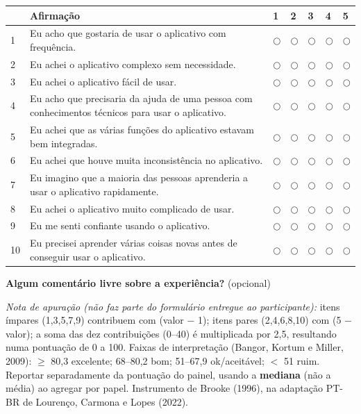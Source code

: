 \documentclass[11pt,a4paper]{article}
\begin{document}
\vspace{4mm}
\renewcommand{\arraystretch}{1.6}
\noindent\begin{tabular}{@{}p{0.6cm}p{8.2cm}p{1.0cm}p{1.0cm}p{1.0cm}p{1.0cm}p{1.0cm}@{}}
  \toprule
   & \textbf{Afirmação} & \textbf{1} & \textbf{2} & \textbf{3} & \textbf{4} & \textbf{5} \\
  \midrule
  1 & Eu acho que gostaria de usar o aplicativo com frequência. & $\bigcirc$ & $\bigcirc$ & $\bigcirc$ & $\bigcirc$ & $\bigcirc$ \\
  2 & Eu achei o aplicativo complexo sem necessidade. & $\bigcirc$ & $\bigcirc$ & $\bigcirc$ & $\bigcirc$ & $\bigcirc$ \\
  3 & Eu achei o aplicativo fácil de usar. & $\bigcirc$ & $\bigcirc$ & $\bigcirc$ & $\bigcirc$ & $\bigcirc$ \\
  4 & Eu acho que precisaria da ajuda de uma pessoa com conhecimentos técnicos para usar o aplicativo. & $\bigcirc$ & $\bigcirc$ & $\bigcirc$ & $\bigcirc$ & $\bigcirc$ \\
  5 & Eu achei que as várias funções do aplicativo estavam bem integradas. & $\bigcirc$ & $\bigcirc$ & $\bigcirc$ & $\bigcirc$ & $\bigcirc$ \\
  6 & Eu achei que houve muita inconsistência no aplicativo. & $\bigcirc$ & $\bigcirc$ & $\bigcirc$ & $\bigcirc$ & $\bigcirc$ \\
  7 & Eu imagino que a maioria das pessoas aprenderia a usar o aplicativo rapidamente. & $\bigcirc$ & $\bigcirc$ & $\bigcirc$ & $\bigcirc$ & $\bigcirc$ \\
  8 & Eu achei o aplicativo muito complicado de usar. & $\bigcirc$ & $\bigcirc$ & $\bigcirc$ & $\bigcirc$ & $\bigcirc$ \\
  9 & Eu me senti confiante usando o aplicativo. & $\bigcirc$ & $\bigcirc$ & $\bigcirc$ & $\bigcirc$ & $\bigcirc$ \\
  10 & Eu precisei aprender várias coisas novas antes de conseguir usar o aplicativo. & $\bigcirc$ & $\bigcirc$ & $\bigcirc$ & $\bigcirc$ & $\bigcirc$ \\
  \bottomrule
\end{tabular}

\vspace{5mm}
\noindent\textbf{Algum comentário livre sobre a experiência?} (opcional)

\vspace{2mm}
\noindent\hrulefill

\vspace{2mm}
\noindent\hrulefill

\vfill
\noindent\footnotesize\textit{Nota de apuração (não faz parte do formulário entregue ao
participante):} itens ímpares (1,3,5,7,9) contribuem com (valor $-$ 1); itens pares (2,4,6,8,10)
com (5 $-$ valor); a soma das dez contribuições (0--40) é multiplicada por 2,5, resultando numa
pontuação de 0 a 100. Faixas de interpretação (Bangor, Kortum e Miller, 2009): $\geq$ 80,3
excelente; 68--80,2 bom; 51--67,9 ok/aceitável; $<$ 51 ruim. Reportar separadamente da pontuação do
painel, usando a \textbf{mediana} (não a média) ao agregar por papel. Instrumento de Brooke (1996),
na adaptação PT-BR de Lourenço, Carmona e Lopes (2022).
\end{document}
